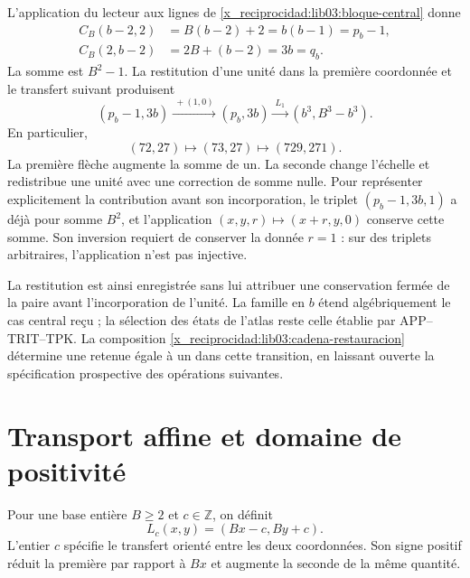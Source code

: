 L’application du lecteur aux lignes de \eqref{x_reciprocidad:lib03:bloque-central} donne
\begin{align}
 C_B(b-2,2)&=B(b-2)+2=b(b-1)=p_b-1,\\
 C_B(2,b-2)&=2B+(b-2)=3b=q_b.
 \label{x_reciprocidad:lib03:concatenaciones}
\end{align}
La somme est \(B^2-1\). La restitution d'une unité dans la première coordonnée et le transfert suivant produisent
\begin{equation}
 (p_b-1,3b)\xrightarrow{\ +(1,0)\ }(p_b,3b)
 \xrightarrow{\ L_1\ }(b^3,B^3-b^3).
 \label{x_reciprocidad:lib03:cadena-restauracion}
\end{equation}
En particulier,
\begin{equation}
 (72,27)\longmapsto(73,27)\longmapsto(729,271).
 \label{x_reciprocidad:lib03:cadena-central}
\end{equation}
La première flèche augmente la somme de un. La seconde change l’échelle
et redistribue une unité avec une correction de somme nulle. Pour représenter
explicitement la contribution avant son incorporation, le triplet
\((p_b-1,3b,1)\) a déjà pour somme \(B^2\), et l’application
\((x,y,r)\mapsto(x+r,y,0)\) conserve cette somme. Son inversion requiert de
conserver la donnée \(r=1\) : sur des triplets arbitraires, l’application n’est
pas injective.

La restitution est ainsi enregistrée sans lui attribuer une conservation fermée de la paire avant l'incorporation de l'unité. La famille en \(b\) étend algébriquement le cas central reçu ; la sélection des états de l'atlas reste celle établie par APP--TRIT--TPK. La composition \eqref{x_reciprocidad:lib03:cadena-restauracion} détermine une retenue égale à un dans cette transition, en laissant ouverte la spécification prospective des opérations suivantes.

\section{Transport affine et domaine de positivité}
\label{x_reciprocidad:lib03:afin}

\begin{definition}
\label{x_reciprocidad:lib03:def-transporte}
Pour une base entière \(B\geq2\) et \(c\in\mathbb Z\), on définit
\begin{equation}
 L_c(x,y)=(Bx-c,By+c).
 \label{x_reciprocidad:lib03:lc}
\end{equation}
L’entier \(c\) spécifie le transfert orienté entre les deux
coordonnées. Son signe positif réduit la première par rapport à \(Bx\)
et augmente la seconde de la même quantité.
\end{definition}

